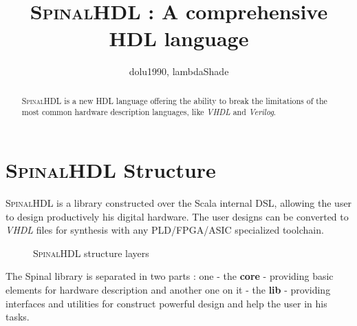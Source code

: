 \documentclass[10pt,twocolumn]{article}
\begin{document}
	
	\title{\textbf{\textsc{SpinalHDL} : A comprehensive HDL language}}
	
	\author{dolu1990, lambdaShade\\}
	
	\maketitle
	\thispagestyle{empty}
	
	\begin{abstract}
		\textsc{SpinalHDL} is a new HDL language offering the ability to break the limitations of the most common hardware description languages, like \textit{VHDL} and \textit{Verilog}.
	\end{abstract}

	\section{\textsc{SpinalHDL} Structure}
		\textsc{SpinalHDL} is a library constructed over the Scala internal DSL, allowing the user to design productively his digital hardware. The user designs can be converted to \textit{VHDL} files for synthesis with any PLD/FPGA/ASIC specialized toolchain. 
		\begin{figure}[!h]

		  \caption{\textsc{SpinalHDL} structure layers}
		  \label{fig:spinalstructure}
		\end{figure}
		\FloatBarrier
		The Spinal library is separated in two parts : one - the \textbf{core} - providing basic elements for hardware description and another one on it - the \textbf{lib} - providing interfaces and utilities for construct powerful design and help the user in his tasks.
		
\end{document}
